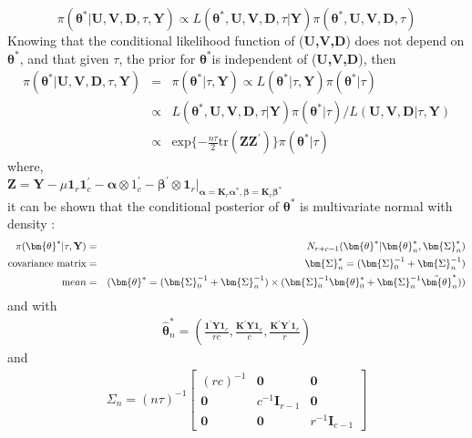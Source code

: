 \begin{equation*}
	\pi(\bm{\theta}^*|\textbf{U},\textbf{V},\textbf{D},\tau,\textbf{Y}) \varpropto L(\bm{\theta}^*,\textbf{U},\textbf{V},\textbf{D},\tau|\textbf{Y})\pi(\bm{\theta}^*,\textbf{U},\textbf{V},\textbf{D},\tau) \nonumber
\end{equation*}	
Knowing that the conditional likelihood function of (\textbf{U,V,D}) does not depend on $\bm{\theta}^*$, and that given $\tau$, the prior for $\bm{\theta}^*$is independent of (\textbf{U,V,D}), then
\begin{eqnarray}
	\pi(\bm{\theta}^*|\textbf{U},\textbf{V},\textbf{D},\tau,\textbf{Y})&=& \pi(\bm{\theta}^*|\tau,\textbf{Y})\varpropto L(\bm{\theta}^*|\tau,\textbf{Y})\pi(\bm{\theta}^*|\tau) \nonumber \\
	&\varpropto& L(\bm{\theta}^*,\textbf{U},\textbf{V},\textbf{D},\tau|\textbf{Y})\pi(\bm{\theta}^*|\tau)/L(\textbf{U},\textbf{V},\textbf{D}|\tau,\textbf{Y}) \nonumber\\
	&	\varpropto & \text{exp} \{-\frac{n\tau}{2}\text{tr}(\textbf{ZZ}^\prime)\}\pi(\bm{\theta}^*|\tau) \nonumber
\end{eqnarray}
where,\\
 $\textbf{Z}=\textbf{Y}-\mu \textbf{1}_r \textbf{1}_c^\prime-\bm{\alpha} \otimes1_c^\prime-\bm{\beta}^\prime\otimes\textbf{1}_r|_{\bm{\alpha}=\textbf{K}_r\bm{\alpha}^*,\bm{\beta}=\textbf{K}_c\bm{\beta}^*}$\\
it can be shown that the conditional posterior of $\bm{\theta}^*$ is multivariate normal with density :
\begin{eqnarray} \pi(\bm{\theta}^*|\tau,\textbf{Y})&=& N_{r+c-1}(\bm{\theta}^*|\bm{\theta}_n^*,\bm{\Sigma}_n^*)\nonumber \\ 
\text{covariance matrix}& =& \bm{\Sigma}_n^*=(\bm{\Sigma}_0^{-1}+\bm{\Sigma}_n^{-1}) \nonumber \\
\text mean &=& (\bm{\theta}^*=(\bm{\Sigma}_0^{-1}+\bm{\Sigma}_n^{-1})\times (\bm{\Sigma}_0^{-1}\bm{\theta}_0^*+\bm{\Sigma}_n^{-1}\hat{\bm{\theta}}_n^*)) \nonumber 
\end{eqnarray}
 and with 
 \begin{eqnarray} 
 \hat{\bm{\theta}}_n^*=(\frac{\textbf{1}^\prime \textbf{Y} \textbf{1}_c}{rc},\frac{\textbf{K}^\prime \textbf{Y} \textbf{1}_c}{c},\frac{\textbf{K}^\prime \textbf{Y}^\prime\textbf{1}_r}{r}) \nonumber
 \end{eqnarray} 
 and 
\begin{eqnarray}
	\Sigma_n=(n\tau)^{-1}	\begin{bmatrix}
	(rc)^{-1} & \bm{0} & \bm{0} \\
	\bm{0} & c^{-1}\textbf{I}_{r-1} & \bm{0}\\
	\bm{0} & \bm{0} & r^{-1} \textbf{I}_{c-1}
	\end{bmatrix} \nonumber
\end{eqnarray}	

